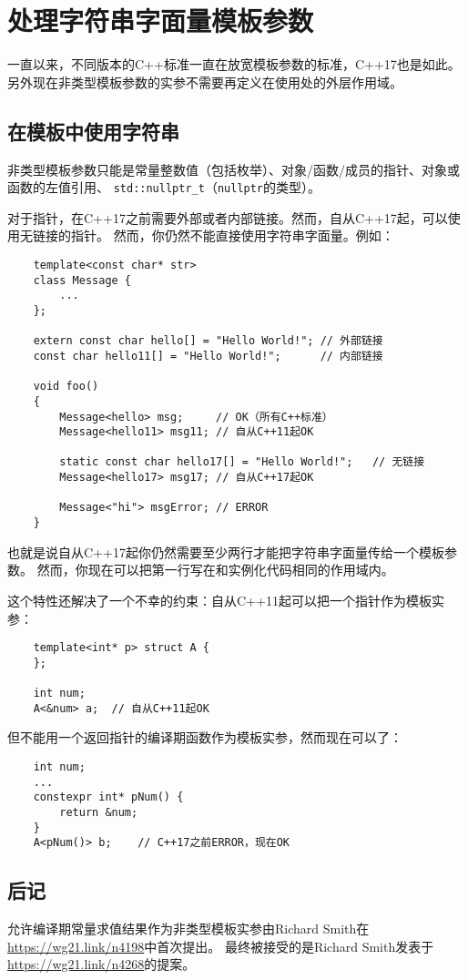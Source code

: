 \chapter{处理字符串字面量模板参数}\label{ch12}
一直以来，不同版本的C++标准一直在放宽模板参数的标准，C++17也是如此。
另外现在非类型模板参数的实参不需要再定义在使用处的外层作用域。

\section{在模板中使用字符串}
非类型模板参数只能是常量整数值（包括枚举）、对象/函数/成员的指针、对象或函数的左值引用、
\texttt{std::nullptr\_t}（\texttt{nullptr}的类型）。

对于指针，在C++17之前需要外部或者内部链接。然而，自从C++17起，可以使用无链接的指针。
然而，你仍然不能直接使用字符串字面量。例如：
\begin{lstlisting}
    template<const char* str>
    class Message {
        ...
    };

    extern const char hello[] = "Hello World!"; // 外部链接
    const char hello11[] = "Hello World!";      // 内部链接

    void foo()
    {
        Message<hello> msg;     // OK（所有C++标准）
        Message<hello11> msg11; // 自从C++11起OK

        static const char hello17[] = "Hello World!";   // 无链接
        Message<hello17> msg17; // 自从C++17起OK

        Message<"hi"> msgError; // ERROR
    }
\end{lstlisting}
也就是说自从C++17起你仍然需要至少两行才能把字符串字面量传给一个模板参数。
然而，你现在可以把第一行写在和实例化代码相同的作用域内。

这个特性还解决了一个不幸的约束：自从C++11起可以把一个指针作为模板实参：
\begin{lstlisting}
    template<int* p> struct A {
    };
    
    int num;
    A<&num> a;  // 自从C++11起OK
\end{lstlisting}
但不能用一个返回指针的编译期函数作为模板实参，然而现在可以了：
\begin{lstlisting}
    int num;
    ...
    constexpr int* pNum() {
        return &num;
    }
    A<pNum()> b;    // C++17之前ERROR，现在OK
\end{lstlisting}

\section{后记}
允许编译期常量求值结果作为非类型模板实参由Richard Smith在\url{https://wg21.link/n4198}中首次提出。
最终被接受的是Richard Smith发表于\url{https://wg21.link/n4268}的提案。